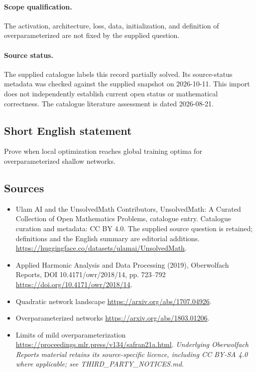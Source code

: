 \documentclass[11pt]{article}
\begin{document}
\paragraph{Scope qualification.}
The activation, architecture, loss, data, initialization, and definition of overparameterized are not fixed by the supplied question.
\paragraph{Source status.}
The supplied catalogue labels this record partially solved. Its source-status metadata was checked against the supplied snapshot on 2026-10-11. This import does not independently establish current open status or mathematical correctness. The catalogue literature assessment is dated 2026-08-21.
\subsection{Short English statement}
Prove when local optimization reaches global training optima for overparameterized shallow networks.
\subsection{Sources}
\begin{itemize}
\item[S1] Ulam AI and the UnsolvedMath Contributors, UnsolvedMath: A Curated Collection of Open Mathematics Problems, catalogue entry. Catalogue curation and metadata: CC BY 4.0. The supplied source question is retained; definitions and the English summary are editorial additions.
\url{https://huggingface.co/datasets/ulamai/UnsolvedMath}.
\item[S2] Applied Harmonic Analysis and Data Processing (2019), Oberwolfach Reports, DOI 10.4171/owr/2018/14, pp. 723--792
\url{https://doi.org/10.4171/owr/2018/14}.
\item[S3] Quadratic network landscape
\url{https://arxiv.org/abs/1707.04926}.
\item[S4] Overparameterized networks
\url{https://arxiv.org/abs/1803.01206}.
\item[S5] Limits of mild overparameterization
\url{https://proceedings.mlr.press/v134/safran21a.html}.
\textit{Underlying Oberwolfach Reports material retains its source-specific licence, including CC BY-SA 4.0 where applicable; see THIRD\_PARTY\_NOTICES.md.}
\end{itemize}
\end{document}
